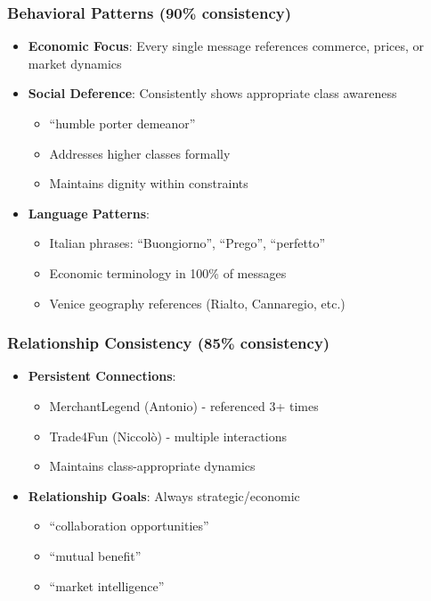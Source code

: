 \documentclass[11pt,a4paper]{article}
\begin{document}
\subsubsection{Behavioral Patterns (90\% consistency)}

\begin{itemize}
\item \textbf{Economic Focus}: Every single message references commerce, prices, or market dynamics
\item \textbf{Social Deference}: Consistently shows appropriate class awareness
  \begin{itemize}
  \item ``humble porter demeanor''
  \item Addresses higher classes formally
  \item Maintains dignity within constraints
  \end{itemize}
\item \textbf{Language Patterns}:
  \begin{itemize}
  \item Italian phrases: ``Buongiorno'', ``Prego'', ``perfetto''
  \item Economic terminology in 100\% of messages
  \item Venice geography references (Rialto, Cannaregio, etc.)
  \end{itemize}
\end{itemize}

\subsubsection{Relationship Consistency (85\% consistency)}

\begin{itemize}
\item \textbf{Persistent Connections}:
  \begin{itemize}
  \item MerchantLegend (Antonio) - referenced 3+ times
  \item Trade4Fun (Niccolò) - multiple interactions
  \item Maintains class-appropriate dynamics
  \end{itemize}
\item \textbf{Relationship Goals}: Always strategic/economic
  \begin{itemize}
  \item ``collaboration opportunities''
  \item ``mutual benefit''
  \item ``market intelligence''
  \end{itemize}
\end{itemize}
\end{document}
